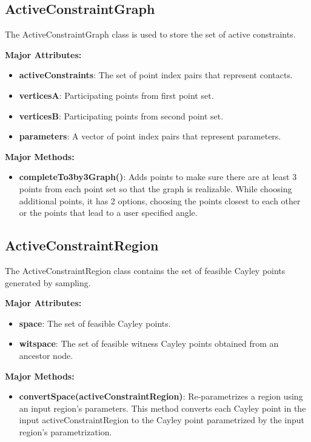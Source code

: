 \subsection{ActiveConstraintGraph} 
The ActiveConstraintGraph class is used to store the set of active constraints.

\noindent \textbf{Major Attributes:} 
\begin{itemize}
		\item  \textbf{activeConstraints}: The set of point index pairs that represent 
				contacts.
		\item  \textbf{verticesA}: Participating points from first point set.
		\item  \textbf{verticesB}: Participating points from second point set.
		\item  \textbf{parameters}: A vector of point index pairs that represent parameters.
\end{itemize}

\noindent \textbf{Major Methods:}
\begin{itemize}
		\item  \textbf{completeTo3by3Graph()}: Adds points to make sure there
				are at least 3 points from each point set so that the graph is
				realizable. While choosing additional points, it has 2 options,
				choosing the points closest to each other or the points that lead
				to a user specified angle.
\end{itemize}


\subsection{ActiveConstraintRegion} 
The ActiveConstraintRegion class contains the set of feasible Cayley points generated
by sampling.

\noindent \textbf{Major Attributes:} 
\begin{itemize}
		\item  \textbf{space}: The set of feasible Cayley points.
		\item  \textbf{witspace}: The set of feasible witness Cayley points
				obtained from an ancestor node.
\end{itemize}

\noindent \textbf{Major Methods:}
\begin{itemize}
		\item  \textbf{convertSpace(activeConstraintRegion)}: Re-parametrizes
				a region using an input region’s parameters. This method
				converts each Cayley point in the input activeConstraintRegion
				to the Cayley point parametrized by the input region's
				parametrization.
\end{itemize}


